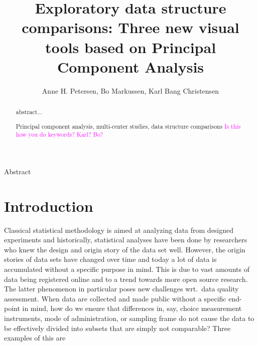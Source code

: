 \documentclass[titlepage,11pt,twoside]{article}
\newcommand{\hl}[1]{\textcolor{magenta}{#1}}
\begin{document}

\title{Exploratory data structure comparisons: Three new visual tools based on Principal Component Analysis}

\author{Anne H. Petersen, Bo Markussen, Karl Bang Christensen}



\vspace{\fill}






\begin{center}\vskip3pt


\vspace{32pt}

Abstract\vskip3pt

\end{center}


\begin{abstract}
abstract...
\begin{keywords}
Principal component analysis, multi-center studies, data structure comparisons \hl{Is this how you do keywords? Karl? Bo?}
\end{keywords}
\end{abstract}

\vspace{\fill}\newpage

\section{Introduction}
\label{sec:introduction}

Classical statistical methodology is aimed at analyzing data from designed experiments and historically, statistical analyses have been done by researchers who knew the design and origin story of the data set well. However, the origin stories of data sets have changed over time and today a lot of data is accumulated without a specific purpose in mind. This is due to vast amounts of data being registered online and to a trend towards more open source research. The latter phenomenon in particular poses new challenges wrt.\ data quality assessment. When data are collected and made public without a specific end-point in mind, how do we ensure that differences in, say, choice measurement instruments, mode of administration, or sampling frame do not cause the data to be effectively divided into subsets that are simply not comparable? Three examples of this are
\end{document}
